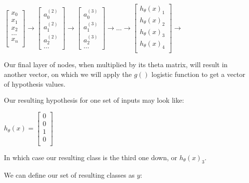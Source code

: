 \documentclass{article}
\begin{document}
$
\left[\begin{matrix}
x_0 \\
x_1 \\
x_2 \\
\dots \\
x_n \\
\end{matrix}\right]
\to
\left[\begin{matrix}
a_0^{(2)} \\
a_1^{(2)} \\
a_2^{(2)} \\
\dots
\end{matrix}\right]
\to
\left[\begin{matrix}
a_0^{(3)} \\
a_1^{(3)} \\
a_2^{(3)} \\
\dots
\end{matrix}\right]
\to
\dots
\to
\left[\begin{matrix}
h_\theta(x)_1 \\
h_\theta(x)_2 \\
h_\theta(x)_3 \\
h_\theta(x)_4 \\
\end{matrix}\right]
\to
$

Our final layer of nodes, when multiplied by its theta matrix, will result in another vector, on which we will apply the $g()$ logistic function to get a vector of hypothesis values.

Our resulting hypothesis for one set of inputs may look like:

$h_\theta(x)=
\left[\begin{matrix}
0 \\
0 \\
1 \\
0 \\
\end{matrix}\right]
$

In which case our resulting class is the third one down, or $h_\theta(x)_3$.

We can define our set of resulting classes as $y$:
\end{document}
